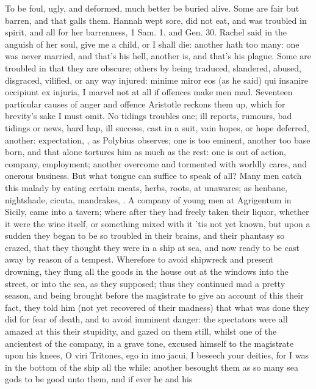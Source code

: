 {To be foul, ugly, and deformed, much better be buried alive. Some are
fair but barren, and that galls them. Hannah wept sore, did not eat,
and was troubled in spirit, and all for her barrenness, 1 Sam. 1. and
Gen. 30. Rachel said in the anguish of her soul, give me a child, or I
shall die: another hath too many: one was never married, and that's his
hell, another is, and that's his plague. Some are troubled in that they
are obscure; others by being traduced, slandered, abused, disgraced,
vilified, or any way injured: minime miror eos (as he said) qui
insanire occipiunt ex injuria, I marvel not at all if offences make men
mad. Seventeen particular causes of anger and offence Aristotle reckons
them up, which for brevity's sake I must omit. No tidings troubles one;
ill reports, rumours, bad tidings or news, hard hap, ill success, cast
in a suit, vain hopes, or hope deferred, another: expectation, , as Polybius
observes; one is too eminent, another too base born, and that alone
tortures him as much as the rest: one is out of action, company,
employment; another overcome and tormented with worldly cares, and
onerous business. But what tongue can suffice to speak of all?
Many men catch this malady by eating certain meats, herbs, roots, at
unawares; as henbane, nightshade, cicuta, mandrakes, \etc{}. A
company of young men at Agrigentum in Sicily, came into a tavern; where
after they had freely taken their liquor, whether it were the wine
itself, or something mixed with it 'tis not yet known, but upon a
sudden they began to be so troubled in their brains, and their phantasy
so crazed, that they thought they were in a ship at sea, and now ready
to be cast away by reason of a tempest. Wherefore to avoid shipwreck
and present drowning, they flung all the goods in the house out at the
windows into the street, or into the sea, as they supposed; thus they
continued mad a pretty season, and being brought before the magistrate
to give an account of this their fact, they told him (not yet recovered
of their madness) that what was done they did for fear of death, and to
avoid imminent danger: the spectators were all amazed at this their
stupidity, and gazed on them still, whilst one of the ancientest of the
company, in a grave tone, excused himself to the magistrate upon his
knees, O viri Tritones, ego in imo jacui, I beseech your deities, \etc{}
for I was in the bottom of the ship all the while: another besought
them as so many sea gods to be good unto them, and if ever he and his
}
